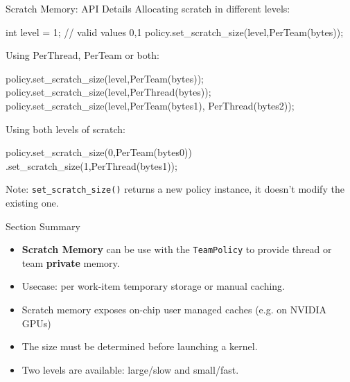 \begin{frame}[fragile]{Scratch Memory: API Details}
Allocating scratch in different levels:
  \begin{code}[keywords=level]
  int level = 1; // valid values 0,1
  policy.set_scratch_size(level,PerTeam(bytes));
  \end{code}

\pause

Using PerThread, PerTeam or both:
  \begin{code}[keywords={PerTeam,PerThread}]
  policy.set_scratch_size(level,PerTeam(bytes));
  policy.set_scratch_size(level,PerThread(bytes));
  policy.set_scratch_size(level,PerTeam(bytes1),
                                PerThread(bytes2));
  \end{code}

\pause

Using both levels of scratch:
  \begin{code}[keywords={PerTeam,PerThread}]
  policy.set_scratch_size(0,PerTeam(bytes0))
        .set_scratch_size(1,PerThread(bytes1));
  \end{code}

Note: \texttt{set\_scratch\_size()} returns a new policy instance, it doesn't modify the existing one.
\end{frame}


\begin{frame}{Section Summary}

  \begin{itemize}
    \item{\textbf{Scratch Memory} can be use with the \texttt{TeamPolicy} to provide thread or team \textbf{private} memory.}
    \item{Usecase: per work-item temporary storage or manual caching.}
    \item{Scratch memory exposes on-chip user managed caches (e.g. on NVIDIA GPUs)}
    \item{The size must be determined before launching a kernel.}
    \item{Two levels are available: large/slow and small/fast.}
  \end{itemize}

\end{frame}

